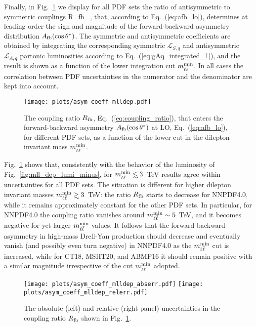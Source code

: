 Finally, in Fig.~\ref{fig:asym_coeff_mlldep} we display for all
PDF sets the
ratio of antisymmetric to symmetric couplings
\be
\label{eq:coupling_ratio}
R_{\rm fb}\equiv {} \, ,
\ee
that, according to
Eq.~(\ref{eq:afb_lo}), determines at leading order
the sign and magnitude
of the forward-backward asymmetry distribution $A_{\rm fb}(\cos\theta^*)$.
%
The symmetric and antisymmetric coefficients are obtained by integrating
the corresponding symmetric $\mathcal{L}_{S,q}$ and antisymmetric
$\mathcal{L}_{A,q}$ partonic luminosities according to
Eq.~(\ref{eq:gAq_integrated_1}), and the result is shown as a function of the lower integration cut $m_{\ell\bar{\ell}}^{\rm min}$.
%
In all cases the correlation between PDF uncertainties in the numerator and
the denominator are kept into account.

\begin{figure}[!t]
 \centering
 \texttt{[image: plots/asym\_coeff\_mlldep.pdf]}
 \caption{The coupling ratio $R_{\rm fb}$,
   Eq.~(\ref{eq:coupling_ratio}),
   that enters the forward-backward asymmetry $A_{\rm
     fb}(\cos\theta^*)$ at LO,  Eq.~(\ref{eq:afb_lo}), for different PDF
   sets, as  a function of the lower cut in the dilepton
   invariant mass $m_{\ell\bar{\ell}}^{\rm min}$.
 }    
 \label{fig:asym_coeff_mlldep}
\end{figure}

Fig.~\ref{fig:asym_coeff_mlldep} shows that, consistently
with the behavior of the luminosity of
Fig.~\ref{fig:mll_dep_lumi_minus},  for $\mll^{{\rm
    min}}\lsim 3$~TeV results agree within uncertainties for all PDF
sets.
%
The situation is different for higher dilepton invariant masses $\mll^{{\rm min}}\gsim 3$~TeV:
the ratio $R_{\rm fb}$ starts to decrease for NNPDF4.0, while it
remains approximately  constant 
for the other  PDF sets. In particular, for NNPDF4.0 the coupling ratio
vanishes around $m_{\ell\bar{\ell}}^{{\rm min}}\sim5$~TeV, and it becomes negative
for yet larger   $m_{\ell\bar{\ell}}^{{\rm min}}$ values.
It follows that the forward-backward
asymmetry in high-mass Drell-Yan production should decrease  and
eventually vanish (and possibly even turn negative)
in NNPDF4.0 as the $m_{\ell\bar{\ell}}^{{\rm min}}$ cut is increased,
while for CT18, MSHT20, and ABMP16 it should remain positive
with a similar magnitude irrespective of the cut  $m_{\ell\bar{\ell}}^{{\rm min}}$ adopted.

\begin{figure}[!t]
 \centering
 \texttt{[image: plots/asym\_coeff\_mlldep\_abserr.pdf]}
 \texttt{[image: plots/asym\_coeff\_mlldep\_relerr.pdf]}
 \caption{The absolute (left) and relative (right panel) uncertainties
   in the coupling ratio $R_{\rm fb}$ shown in Fig.~\ref{fig:asym_coeff_mlldep}.
 }    
 \label{fig:asym_coeff_mlldep_err}
\end{figure}

